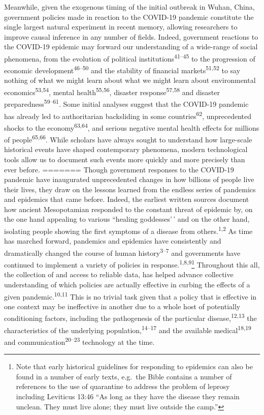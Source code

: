 \documentclass[]{article}
\let\rmarkdownfootnote\footnote%
\def\footnote{\protect\rmarkdownfootnote}
\begin{document}
Meanwhile, given the exogenous timing of the initial outbreak in Wuhan, China, government policies made in reaction to the COVID-19 pandemic constitute the single largest natural experiment in recent memory, allowing researchers to improve causal inference in any number of fields. Indeed, government reactions to the COVID-19 epidemic may forward our understanding of a wide-range of social phenomena, from the evolution of political institutions\textsuperscript{41--45} to the progression of economic development\textsuperscript{46--50} and the stability of financial markets\textsuperscript{51,52} to say nothing of what we might learn about what we might learn about environmental economics\textsuperscript{53,54}, mental health\textsuperscript{55,56}, disaster response\textsuperscript{57,58} and disaster preparedness\textsuperscript{59--61}. Some initial analyses suggest that the COVID-19 pandemic has already led to authoritarian backsliding in some countries\textsuperscript{62}, unprecedented shocks to the economy\textsuperscript{63,64}, and serious negative mental health effects for millions of people\textsuperscript{65,66}. While scholars have always sought to understand how large-scale historical events have shaped contemporary phenomena, modern technological tools allow us to document such events more quickly and more precisely than ever before.
=======
Though government responses to the COVID-19 pandemic have inaugurated unprecedented changes in how billions of people live their lives, they draw on the lessons learned from the endless series of pandemics and epidemics that came before. Indeed, the earliest written sources document how ancient Mesopotamian responded to the constant threat of epidemic by, on the one hand appealing to various ``healing goddesses'\,' and on the other hand, isolating people showing the first symptoms of a disease from others.\textsuperscript{1,2} As time has marched forward, pandemics and epidemics have consistently and dramatically changed the course of human history\textsuperscript{3--7} and governments have continued to implement a variety of policies in response.\textsuperscript{1,8,9}\footnote{Note that early historical guidelines for responding to epidemics can also be found in a number of early texts, e.g.~the Bible contains a number of references to the use of quarantine to address the problem of leprosy including Leviticus 13:46 ``As long as they have the disease they remain unclean. They must live alone; they must live outside the camp.''} Throughout this all, the collection of and access to reliable data, has helped advance collective understanding of which policies are actually effective in curbing the effects of a given pandemic.\textsuperscript{10,11} This is no trivial task given that a policy that is effective in one context may be ineffective in another due to a whole host of potentially conditioning factors, including the pathogenesis of the particular disease,\textsuperscript{12,13} the characteristics of the underlying population,\textsuperscript{14--17} and the available medical\textsuperscript{18,19} and communication\textsuperscript{20--23} technology at the time.
\end{document}
